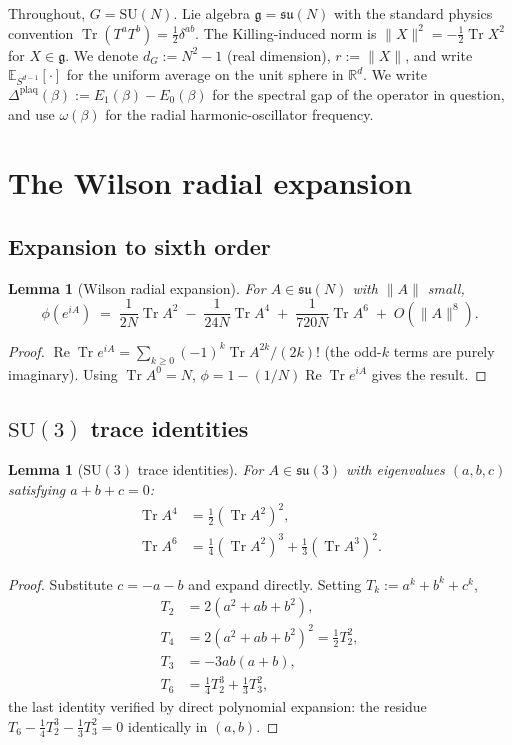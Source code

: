 \documentclass[11pt,a4paper]{article}
\newtheorem{lemma}[theorem]{Lemma}
\theoremstyle{definition}
\newcommand{\SU}{\mathrm{SU}}
\newcommand{\Tr}{\operatorname{Tr}}
\renewcommand{\Re}{\operatorname{Re}}
\newcommand{\E}{\mathbb{E}}
\newcommand{\R}{\mathbb{R}}
\newcommand{\Gap}{{\Delta^{\mathrm{plaq}}}}
\begin{document}
Throughout, $G = \SU(N)$. Lie algebra $\mathfrak{g} = \mathfrak{su}(N)$
with the standard physics convention
$\Tr(T^aT^b) = \tfrac{1}{2}\delta^{ab}$. The Killing-induced norm is
$\|X\|^2 = -\tfrac{1}{2}\Tr X^2$ for $X\in\mathfrak{g}$. We denote
$d_G := N^2-1$ (real dimension), $r := \|X\|$, and write
$\E_{S^{d-1}}[\cdot]$ for the uniform average on the unit sphere
in $\R^d$. We write $\Gap(\beta) := E_1(\beta) - E_0(\beta)$ for the
spectral gap of the operator in question, and use $\omega(\beta)$ for
the radial harmonic-oscillator frequency.

\section{The Wilson radial expansion}\label{sec:wilson}

\subsection{Expansion to sixth order}

\begin{lemma}[Wilson radial expansion]\label{lem:phi-expand}
For $A \in \mathfrak{su}(N)$ with $\|A\|$ small,
\[
\phi(e^{iA})
\;=\;
\frac{1}{2N}\Tr A^2
\;-\;\frac{1}{24N}\Tr A^4
\;+\;\frac{1}{720N}\Tr A^6
\;+\;O(\|A\|^8).
\]
\end{lemma}

\begin{proof}
$\Re\Tr e^{iA} = \sum_{k\ge 0} (-1)^k\Tr A^{2k}/(2k)!$ (the odd-$k$
terms are purely imaginary). Using $\Tr A^0 = N$, $\phi = 1 -
(1/N)\Re\Tr e^{iA}$ gives the result.
\end{proof}

\subsection{$\SU(3)$ trace identities}

\begin{lemma}[$\SU(3)$ trace identities]\label{lem:trace-id}
For $A \in \mathfrak{su}(3)$ with eigenvalues $(a,b,c)$ satisfying
$a+b+c=0$:
\begin{align}
\Tr A^4 &= \tfrac{1}{2}(\Tr A^2)^2, \\
\Tr A^6 &= \tfrac{1}{4}(\Tr A^2)^3 + \tfrac{1}{3}(\Tr A^3)^2.
\end{align}
\end{lemma}

\begin{proof}
Substitute $c = -a-b$ and expand directly. Setting
$T_k := a^k+b^k+c^k$,
\begin{align*}
T_2 &= 2(a^2+ab+b^2),\\
T_4 &= 2(a^2+ab+b^2)^2 = \tfrac{1}{2}T_2^2,\\
T_3 &= -3ab(a+b),\\
T_6 &= \tfrac{1}{4}T_2^3 + \tfrac{1}{3}T_3^2,
\end{align*}
the last identity verified by direct polynomial expansion: the
residue $T_6 - \tfrac{1}{4}T_2^3 - \tfrac{1}{3}T_3^2 = 0$
identically in $(a,b)$.
\end{proof}
\end{document}
